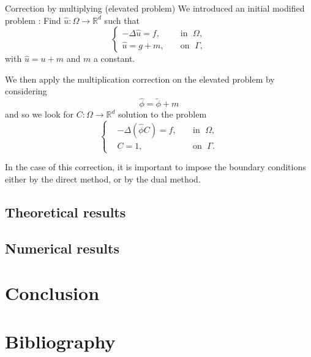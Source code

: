 \documentclass[compress,10pt,xcolor={table,dvipsnames},t]{beamer}
\begin{document}
	\begin{frame}{Correction by multiplying (elevated problem)}
		We introduced an initial modified problem : Find $\hat{u} : \Omega \rightarrow \mathbb{R}^d$ such that
		\begin{equation*}
			\left\{
			\begin{aligned}
				-\Delta \hat{u} = f, \; &&\text{in } \; \Omega, \\
				\hat{u}=g+m, \; &&\text{on } \; \Gamma,
			\end{aligned}
			\right.
		\end{equation*}
		with $\hat{u}=u+m$ and $m$ a constant.
		
		We then apply the multiplication correction on the elevated problem by considering
		\begin{equation*}
			\hat{\phi}=\tilde{\phi}+m
		\end{equation*}
		and so we look for $C: \Omega \rightarrow \mathbb{R}^d$ solution to the problem
		\begin{equation*}
			\label{eq.corr.pbc_mult_reh}
			\left\{\begin{aligned}
				&-\Delta (\hat{\phi}C)=f, \; &&\text{in } \; \Omega, \\
				&C=1, \; &&\text{on } \; \Gamma.
			\end{aligned}\right. %
		\end{equation*}
		
		In the case of this correction, it is important to impose the boundary conditions either by the direct method, or by the dual method.
	\end{frame}
%	
	\subsection{Theoretical results}
	
	\subsection{Numerical results}
	
	\section{Conclusion} %

	\section{Bibliography}
	
	\begin{frame}[allowframebreaks]{}
		\printbibliography[heading=none]
	\end{frame}
	
\end{document}
